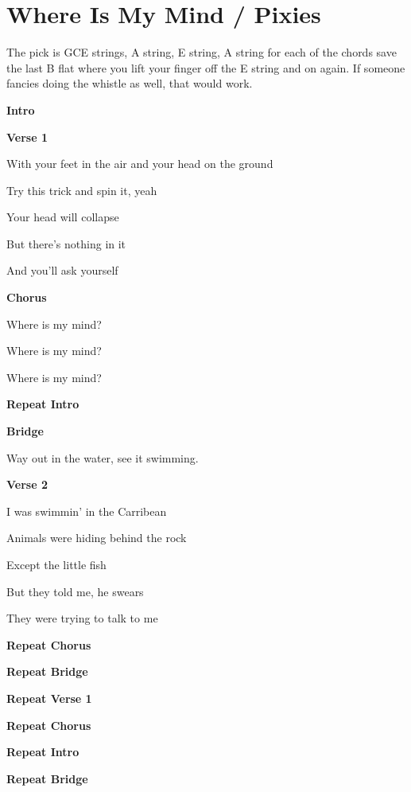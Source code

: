 \section{Where Is My Mind / Pixies}\label{sec:whereismymind}

\Fmajor
\Dminor
\Amajor
\BflatMajor 


{\small{The pick is GCE strings, A string, E string, A string for each of the chords save the last B flat where you lift your finger off the E string and on again. If someone fancies doing the whistle as well, that would work.}}

\textbf{Intro}

   

\textbf{Verse 1}

With your feet in the air and your head on the ground  

Try this trick and spin it, yeah

Your head will collapse

But there's nothing in it 

And you'll ask yourself

\textbf{Chorus}

Where is my mind?

Where is my mind?  

Where is my mind?  

\textbf{Repeat Intro}

\textbf{Bridge}

Way out in the water, see it swimming.

\textbf{Verse 2}

I was swimmin' in the Carribean

Animals were hiding behind the rock

Except the little fish

But they told me, he swears

They were trying to talk to me

\textbf{Repeat Chorus}

\textbf{Repeat Bridge}

\textbf{Repeat Verse 1}

\textbf{Repeat Chorus}

\textbf{Repeat Intro}

\textbf{Repeat Bridge}
